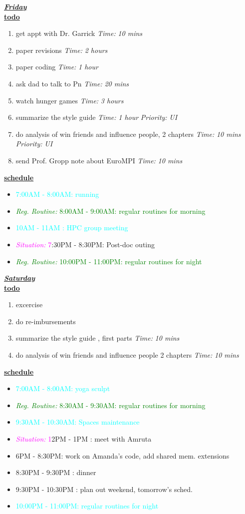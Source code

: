 \documentclass[11pt]{article}
\newcommand{\timeEst}[1]{\textit{Time:} \textit{#1}}
\newcommand{\priority}[1]{\textit{Priority:} \textit{#1}}
\newcommand{\regItem}[1]{\item \textcolor{cyan}{#1}}
\newcommand{\regRoutineItem}[1]{\item \textcolor{green}{\textit{Reg. Routine:} #1}}
\newcommand{\situationItem}[1]{\item \textcolor{magenta}{\textit{Situation:} #1}}
\begin{document}
\underline{\textbf{\textit{Friday}}}\\
\underline{\textbf{todo}}\\
\begin{enumerate}
\item get appt with Dr. Garrick \timeEst{10 mins}
\item paper revisions \timeEst{2 hours}
\item paper coding \timeEst{1 hour}
\item ask dad to talk to Pn \timeEst{20 mins}
\item watch hunger games \timeEst{3 hours}
\item summarize the style guide \timeEst{1 hour} \priority{UI}
\item do analysis of win friends and influence people, 2 chapters \timeEst{10 mins}  \priority{UI}
\item send Prof. Gropp note about EuroMPI \timeEst{10 mins}
\end{enumerate}

\underline{\textbf{schedule}}\\
\begin{itemize}
\regItem{7:00AM - 8:00AM: running}
\regRoutineItem {8:00AM - 9:00AM: regular routines for morning}
\regItem{10AM - 11AM : HPC group meeting}
\situationItem 7:30PM - 8:30PM: Post-doc outing
\regRoutineItem{10:00PM - 11:00PM: regular routines for night}
\end{itemize}

\underline{\textbf{\textit{Saturday}}}\\
\underline{\textbf{todo}}\\
\begin{enumerate}
\item excercise
\item do re-imbursements

\item summarize the style guide , first parts \timeEst{10 mins}
\item do analysis of win friends and influence people 2 chapters \timeEst{10 mins}

\end{enumerate}

\underline{\textbf{schedule}}\\
\begin{itemize}
\regItem{7:00AM - 8:00AM: yoga sculpt}
\regRoutineItem {8:30AM - 9:30AM: regular routines for morning}
\regItem{9:30AM - 10:30AM: Spaces maintenance}
\situationItem 12PM - 1PM :  meet with Amruta
\item 6PM - 8:30PM: work on Amanda's code, add shared mem. extensions
\item 8:30PM - 9:30PM : dinner
\item 9:30PM - 10:30PM : plan out weekend, tomorrow's sched.
\regItem{10:00PM - 11:00PM: regular routines for night}
\end{itemize}
\end{document}
